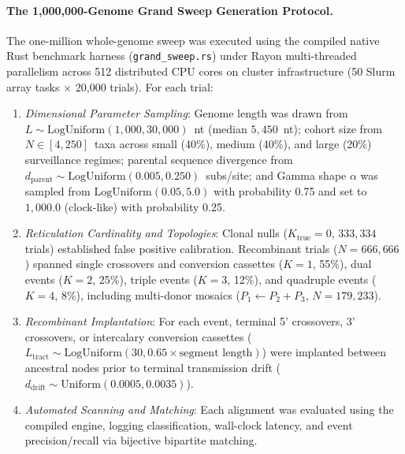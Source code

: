 \paragraph{The 1,000,000-Genome Grand Sweep Generation Protocol.}
The one-million whole-genome sweep was executed using the compiled native Rust benchmark harness (\texttt{grand\_sweep.rs}) under Rayon multi-threaded parallelism across 512 distributed CPU cores on cluster infrastructure (50 Slurm array tasks $\times$ 20,000 trials). For each trial:
\begin{enumerate}
    \item \textit{Dimensional Parameter Sampling}: Genome length was drawn from $L \sim \text{LogUniform}(1{,}000, 30{,}000)$~nt (median $5{,}450$~nt); cohort size from $N \in [4, 250]$~taxa across small (40\%), medium (40\%), and large (20\%) surveillance regimes; parental sequence divergence from $d_{\mathrm{parent}} \sim \text{LogUniform}(0.005, 0.250)$~subs/site; and Gamma shape $\alpha$ was sampled from $\text{LogUniform}(0.05, 5.0)$ with probability 0.75 and set to $1{,}000.0$ (clock-like) with probability 0.25.
    \item \textit{Reticulation Cardinality and Topologies}: Clonal nulls ($K_{\mathrm{true}} = 0$, $333{,}334$ trials) established false positive calibration. Recombinant trials ($N = 666{,}666$) spanned single crossovers and conversion cassettes ($K=1$, 55\%), dual events ($K=2$, 25\%), triple events ($K=3$, 12\%), and quadruple events ($K=4$, 8\%), including multi-donor mosaics ($P_1 \leftarrow P_2 + P_3$, $N = 179{,}233$).
    \item \textit{Recombinant Implantation}: For each event, terminal 5' crossovers, 3' crossovers, or intercalary conversion cassettes ($L_{\mathrm{tract}} \sim \text{LogUniform}(30, 0.65 \times \text{segment length})$) were implanted between ancestral nodes prior to terminal transmission drift ($d_{\mathrm{drift}} \sim \text{Uniform}(0.0005, 0.0035)$).
    \item \textit{Automated Scanning and Matching}: Each alignment was evaluated using the compiled engine, logging classification, wall-clock latency, and event precision/recall via bijective bipartite matching.
\end{enumerate}

